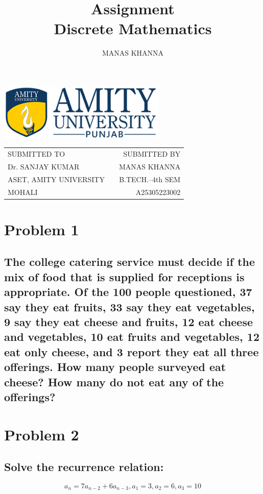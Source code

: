 \documentclass[12pt, a4paper]{extarticle}
\title{Assignment\\Discrete Mathematics}
\author{MANAS KHANNA}
\begin{document}
\maketitle
\begin{center}
\includegraphics[width=0.6\textwidth]{images.png}
\end{center}
\vspace{30px}
\begin{center}
\begin{tabular}{llr}
SUBMITTED TO           &  & SUBMITTED BY       \\
Dr. SANJAY KUMAR       &  & MANAS KHANNA \\
ASET, AMITY UNIVERSITY &  & B.TECH.–4th SEM    \\
MOHALI                 &  & A25305223002     
\end{tabular}
\end{center}
\newpage
{}
\section{Problem 1}

\subsection*{The college catering service must decide if the mix of food that is supplied for receptions is appropriate. Of the 100 people questioned, 37 say they eat fruits, 33 say they eat vegetables, 9 say they eat cheese and fruits, 12 eat cheese and vegetables, 10 eat fruits and vegetables, 12 eat only cheese, and 3 report they eat all three offerings. How many people surveyed eat cheese? How many do not eat any of the offerings?}

\section{Problem 2}

\subsection*{Solve the recurrence relation: }
\[
  a_n = 7a_{n-2} + 6 a_{n-3}, a_1 = 3, a_2 = 6, a_3 = 10
\]
\end{document}
